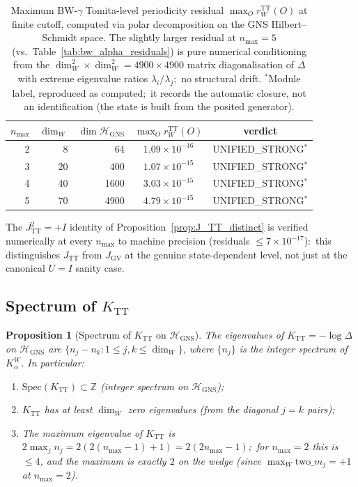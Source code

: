\documentclass[11pt,a4paper]{article}
\theoremstyle{plain}
\newtheorem{proposition}[theorem]{Proposition}
\theoremstyle{definition}
\newcommand{\nmax}{n_{\max}}
\newcommand{\Hilb}{\mathcal{H}}
\newcommand{\Z}{\mathbb{Z}}
\newcommand{\TT}{\mathrm{TT}}
\newcommand{\GNS}{\mathrm{GNS}}
\begin{document}
\begin{table}[ht]
\centering
\caption{Maximum BW-$\gamma$ Tomita-level periodicity residual
$\max_O r_W^{\TT}(O)$ at finite cutoff, computed via polar
decomposition on the GNS Hilbert--Schmidt space. The slightly larger
residual at $\nmax = 5$ (vs.~Table~\ref{tab:bw_alpha_residuals}) is
pure numerical conditioning from the
$\dim_W^2 \times \dim_W^2 = 4900 \times 4900$ matrix diagonalisation
of $\Delta$ with extreme eigenvalue ratios
$\lambda_i / \lambda_j$;\ no structural drift. $^{*}$Module label,
reproduced as computed;\ it records the automatic closure, not an
identification (the state is built from the posited generator).}
\label{tab:bw_gamma_residuals}
\begin{tabular}{rrrcc}
\toprule
$\nmax$ & $\dim_W$ & $\dim \Hilb_{\GNS}$ &
$\max_O r_W^{\TT}(O)$ &
verdict\\
\midrule
2 & 8  & 64   & $1.09 \times 10^{-16}$ & UNIFIED\_STRONG$^{*}$ \\
3 & 20 & 400  & $1.07 \times 10^{-15}$ & UNIFIED\_STRONG$^{*}$ \\
4 & 40 & 1600 & $3.03 \times 10^{-15}$ & UNIFIED\_STRONG$^{*}$ \\
5 & 70 & 4900 & $4.79 \times 10^{-15}$ & UNIFIED\_STRONG$^{*}$ \\
\bottomrule
\end{tabular}
\end{table}

The $J_{\TT}^2 = +I$ identity of Proposition~\ref{prop:J_TT_distinct}
is verified numerically at every $\nmax$ to machine precision
(residuals $\le 7 \times 10^{-17}$):\ this distinguishes $J_{\TT}$
from $J_{\mathrm{GV}}$ at the genuine state-dependent level, not just
at the canonical $U = I$ sanity case.

\subsection{Spectrum of $K_{\TT}$}\label{sec:K_TT_spectrum}

\begin{proposition}[Spectrum of $K_{\TT}$ on $\Hilb_{\GNS}$]
\label{prop:K_TT_spectrum}
The eigenvalues of $K_{\TT} = -\log \Delta$ on $\Hilb_{\GNS}$ are
$\{n_j - n_k : 1 \le j, k \le \dim_W\}$, where $\{n_j\}$ is the integer
spectrum of $K_\alpha^W$. In particular:
\begin{enumerate}\setlength{\itemsep}{2pt}
\item[(a)] $\mathrm{Spec}(K_{\TT}) \subset \Z$ (integer spectrum on
$\Hilb_{\GNS}$);
\item[(b)] $K_{\TT}$ has at least $\dim_W$ zero eigenvalues (from the
diagonal $j = k$ pairs);
\item[(c)] The maximum eigenvalue of $K_{\TT}$ is $2 \max_j n_j =
2(2(\nmax - 1) + 1) = 2(2\nmax - 1)$;\ for $\nmax = 2$ this is $\le 4$,
and the maximum is exactly $2$ on the wedge (since $\max_W
\mathrm{two}\_m_j = +1$ at $\nmax = 2$).
\end{enumerate}
\end{proposition}
\end{document}
